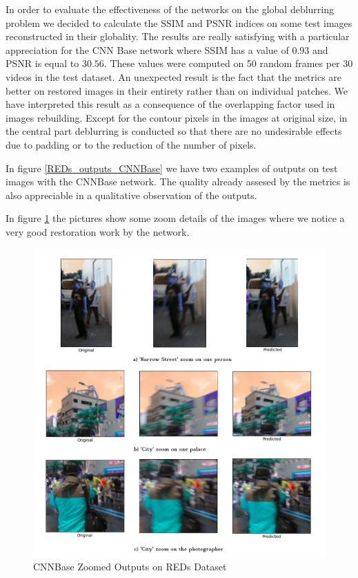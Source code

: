 \documentclass[12pt,a4paper]{article}
\begin{document}
In order to evaluate the effectiveness of the networks on the global deblurring problem we decided to calculate the SSIM and PSNR indices on some test images reconstructed in their globality. The results are really satisfying with a particular appreciation for the CNN Base network where SSIM has a value of $0.93$ and PSNR is equal to $30.56$. These values were computed on 50 random frames per 30 videos in the test dataset. An unexpected result is the fact that the metrics are better on  restored images in their entirety rather than on individual patches. We have interpreted this result as a consequence of the overlapping factor used in images rebuilding. Except for the contour pixels in the images at original size, in the central part deblurring is conducted so that there are no undesirable effects due to padding or to the reduction of the number of pixels.


In figure \ref{REDs_outputs_CNNBase} we have two examples of outputs on test images with the CNNBase network. The quality already assesed by the metrics is also appreciable in a qualitative observation of the outputs. 

In figure \ref{REDs_outputs_CNNBase_Zoom} the pictures show some zoom details of the images where we notice a very good restoration work by the network.

\begin{figure}[hptb]
\centering
\includegraphics[scale=0.35]{REDs_CNNBase_Outputs_Zoom.png} 
\caption{CNNBase Zoomed Outputs on REDs Dataset}
\label{REDs_outputs_CNNBase_Zoom}
\end{figure}
\end{document}
